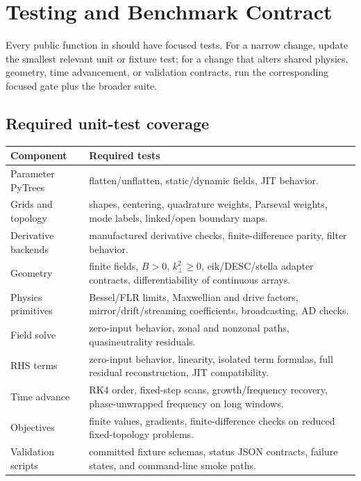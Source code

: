 \documentclass[11pt,a4paper]{article}
\begin{document}
\section{Testing and Benchmark Contract}

Every public function in  should have focused tests.  For a narrow
change, update the smallest relevant unit or fixture test; for a change that
alters shared physics, geometry, time advancement, or validation contracts, run
the corresponding focused gate plus the broader suite.

\subsection{Required unit-test coverage}

\begin{longtable}{p{}p{}}
\toprule
Component & Required tests \\
\midrule
Parameter PyTrees & flatten/unflatten, static/dynamic fields, JIT behavior. \\
Grids and topology & shapes, centering, quadrature weights, Parseval weights, mode labels, linked/open boundary maps. \\
Derivative backends & manufactured derivative checks, finite-difference parity, filter behavior. \\
Geometry & finite fields, \(B>0\), \(k_\perp^2\ge0\), eik/DESC/stella adapter contracts, differentiability of continuous arrays. \\
Physics primitives & Bessel/FLR limits, Maxwellian and drive factors, mirror/drift/streaming coefficients, broadcasting, AD checks. \\
Field solve & zero-input behavior, zonal and nonzonal paths, quasineutrality residuals. \\
RHS terms & zero-input behavior, linearity, isolated term formulas, full residual reconstruction, JIT compatibility. \\
Time advance & RK4 order, fixed-step scans, growth/frequency recovery, phase-unwrapped frequency on long windows. \\
Objectives & finite values, gradients, finite-difference checks on reduced fixed-topology problems. \\
Validation scripts & committed fixture schemas, status JSON contracts, failure states, and command-line smoke paths. \\
\bottomrule
\end{longtable}
\end{document}
